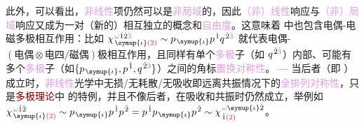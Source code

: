 此外，可以看出，\textcolor{Plum}{非线性}项仍然可以是\textcolor{Plum}{非局域}的，因此\textcolor{Plum}{（非）线性}响应与\textcolor{Plum}{（非）局域}响应又成为一对（新的）相互独立的概念和\textcolor{Plum}{自由度}。这意味着  中也包含\textcolor{NavyBlue}{电偶-电磁多}极相互作用：比如 $\chi^{\;\! \mathcolor{gray}{\omega} \hat{1} \hat{2} \mathcolor{gray}{\hat{3}}}_{\;\! \symup{\iota} \textcolor{Maroon}{(2)}} \sim p_{\;\! \symup{\iota}} p^{\;\! \hat{1}} q^{\;\! \hat{2} \mathcolor{gray}{\hat{3}}}$ 就代表\textcolor{NavyBlue}{电偶-$(\text{电偶}\otimes\text{电四/磁偶})$}极相互作用，且同样有单个\textcolor{Plum}{多极}子（如 $q^{\;\! \hat{2} \mathcolor{gray}{\hat{3}}}$）内部、可能有多个{\textcolor{Plum}{多极}子}（如$\{p_{\;\! \symup{\iota}}, p^{\;\! \hat{1}}, q^{\;\! \hat{2} \mathcolor{gray}{\hat{3}}}\}$）之间的角标\textcolor{Plum}{置换对称性}。 ---  当后者（即 ）成立时，\textcolor{Plum}{非线性}\textcolor{NavyBlue}{光学}中无\textcolor{NavyBlue}{损}/无\textcolor{NavyBlue}{耗散}/无\textcolor{NavyBlue}{吸收}即远离\textcolor{NavyBlue}{共振}情况下的\textcolor{Plum}{全排列对称性}\cite{boydNonlinearOptics2019}，只是\textcolor{Maroon}{多极理论}中  的特例，并且不像后者，在\textcolor{NavyBlue}{吸收}和\textcolor{NavyBlue}{共振}时仍然成立，举例如 $\chi^{\;\! \mathcolor{gray}{\omega} \hat{1} \hat{2}}_{\;\! \symup{\iota} \textcolor{Maroon}{(2)}} \sim p_{\;\! \symup{\iota}} p^{\;\! \hat{1}} p^{\;\! \hat{2}} = p^{\;\! \hat{1}} p_{\;\! \symup{\iota}} p^{\;\! \hat{2}} \sim \chi^{\;\! \mathcolor{gray}{\omega} \symup{\iota} \hat{2}}_{\;\! \hat{1} \textcolor{Maroon}{(2)}}$\cite{raabMultipoleTheoryElectromagnetism2004}。

